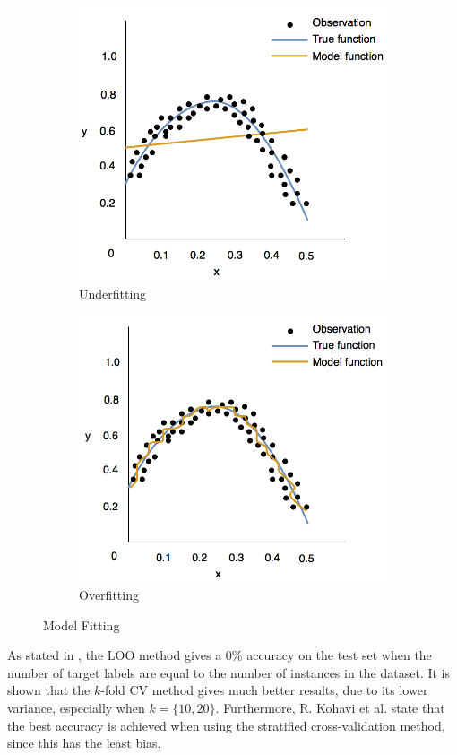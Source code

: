 \begin{figure}
\centering
\begin{subfigure}
  \centering
  \includegraphics[width=0.4\linewidth]{underfitting.png}
  \caption{Underfitting}
  \label{fig:underfitting}
\end{subfigure}
\begin{subfigure}
  \centering
  \includegraphics[width=.4\linewidth]{overfitting.png}
  \caption{Overfitting}
  \label{fig:overfitting}
\end{subfigure}
\caption{Model Fitting}
\label{fig:models}
\end{figure}

As stated in \cite{Kohavi1995study}, the LOO method gives a 0\% accuracy on the test set when the number of target labels are equal to the number of instances in the dataset. It is shown that the \(k\)-fold CV method gives much better results, due to its lower variance, especially when \(k = \{10, 20\}\). Furthermore, R. Kohavi et al. state that the best accuracy is achieved when using the stratified cross-validation method, since this has the least bias.

